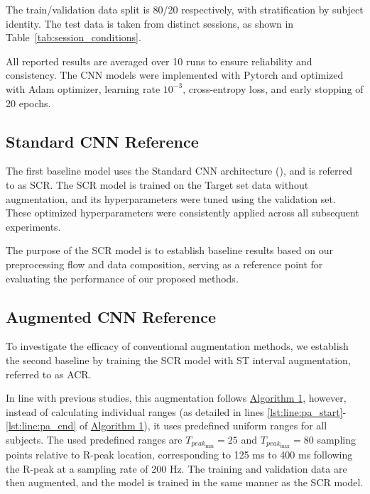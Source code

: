 The train/validation data split is 80/20 respectively, with stratification by subject identity. The test data is taken from distinct sessions, as shown in Table~\ref{tab:session_conditions}.

All reported results are averaged over 10 runs to ensure reliability and consistency.
The CNN models were implemented with Pytorch\cite{paszke2019pytorchimperativestylehighperformance} and optimized with Adam optimizer\cite{kingma2017adammethodstochasticoptimization}, learning rate $10^{-3}$, cross-entropy loss, and early stopping of 20 epochs.

\subsection{Standard CNN Reference}
\label{chap:scr}
The first baseline model uses the Standard CNN architecture (), and is referred to as SCR.
The SCR model is trained on the Target set data without augmentation, and its hyperparameters were tuned using the validation set.
These optimized hyperparameters were consistently applied across all subsequent experiments.

The purpose of the SCR model is to establish baseline results based on our preprocessing flow and data composition, serving as a reference point for evaluating the performance of our proposed methods.

\subsection{Augmented CNN Reference}
\label{chap:acr}
To investigate the efficacy of conventional augmentation methods, we establish the second baseline by training the SCR model with ST interval augmentation, referred to as ACR.

In line with previous studies, this augmentation follows \hyperlink{individual_augmentation}{Algorithm 1}, however, instead of calculating individual ranges (as detailed in lines \ref{lst:line:pa_start}-\ref{lst:line:pa_end} of \hyperlink{individual_augmentation}{Algorithm 1}), it uses predefined uniform ranges for all subjects.
The used predefined ranges are $T_{peak_{\text{min}}} = 25$ and $T_{peak_{\text{max}}} = 80$ sampling points relative to R-peak location, corresponding to 125 ms to 400 ms following the R-peak at a sampling rate of 200 Hz.
The training and validation data are then augmented, and the model is trained in the same manner as the SCR model.

